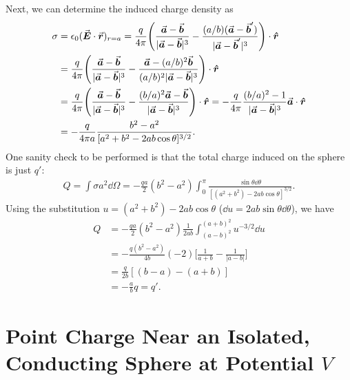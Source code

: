 Next, we can determine the induced charge density as
\begin{align}
    \sigma &= \epsilon_0 (\va*{E} \cdot \va*{r})_{r = a} = \frac{q}{4 \pi} \Bigg( \frac{\va*{a} - \va*{b}}{|\va*{a} - \va*{b}|^3} - \frac{(a/b)(\va*{a} - \va*{b}')}{|\va*{a} - \va*{b}'|^3} \Bigg) \cdot \vu*{r} \\
    &= \frac{q}{4 \pi} \Bigg( \frac{\va*{a} - \va*{b}}{|\va*{a} - \va*{b}|^3} - \frac{\va*{a} - (a/b)^2\va*{b}}{(a/b)^2|\va*{a} - \va*{b}|^3} \Bigg) \cdot \vu*{r} \\
    &= \frac{q}{4 \pi} \Bigg( \frac{\va*{a} - \va*{b}}{|\va*{a} - \va*{b}|^3} - \frac{(b/a)^2\va*{a} - \va*{b}}{|\va*{a} - \va*{b}|^3} \Bigg) \cdot \vu*{r} = - \frac{q}{4 \pi} \frac{ (b/a)^2 - 1 }{|\va*{a} - \va*{b}|^3} \va*{a} \cdot \vu*{r} \\
    &= - \frac{q}{4 \pi a} \frac{b^2 - a^2}{[a^2 + b^2 - 2ab\cos{\theta}]^{3/2}}
.\end{align}
One sanity check to be performed is that the total charge induced on the sphere is just $q'$:
\begin{align}
    Q = \int \sigma a^2 \dd{\Omega} = -\frac{q a}{2} (b^2 - a^2) \int_{0}^{\pi} \frac{\sin{\theta} \dd{\theta}}{[(a^2 + b^2) - 2ab \cos{\theta}]^{3/2}}
.\end{align}
Using the substitution $u = (a^2 + b^2) - 2ab \cos{\theta}$ ($\dd{u} = 2ab\sin{\theta} \dd{\theta}$), we have
\begin{align}
    Q &= -\frac{qa}{2} (b^2 - a^2) \frac{1}{2ab} \int_{(a-b)^2}^{(a+b)^2} u^{-3/2} \dd{u} \nonumber \\
    &= -\frac{q(b^2-a^2)}{4b} (-2) \Big[ \frac{1}{a + b} - \frac{1}{|a - b|} \Big] \nonumber \\
    &= \frac{q}{2b} [ (b-a) - (a + b) ] \nonumber \\
    &= -\frac{a}{b}q = q'
.\end{align}


\section{Point Charge Near an Isolated, Conducting Sphere at Potential $V$}

